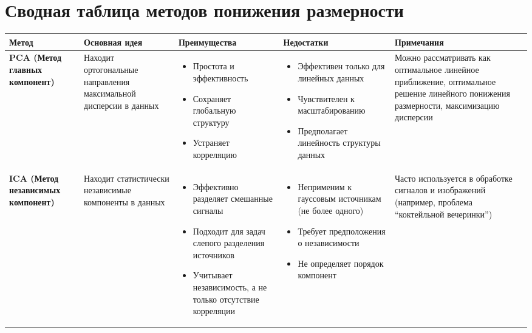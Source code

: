\documentclass[a4paper,12pt]{article}
\begin{document}
\section{Сводная таблица методов понижения размерности}


{\small
\begin{longtable}{|p{3.5cm}|p{3.5cm}|p{2.8cm}|p{2.8cm}|p{2.8cm}|}
\hline
\textbf{Метод} & \textbf{Основная идея} & \textbf{Преимущества} & \textbf{Недостатки} & \textbf{Примечания} \\
\hline
\endhead

\textbf{PCA (Метод главных компонент)} & 
Находит ортогональные направления максимальной дисперсии в данных & 
\begin{itemize}[leftmargin=*]
    \item Простота и эффективность
    \item Сохраняет глобальную структуру
    \item Устраняет корреляцию
\end{itemize} & 
\begin{itemize}[leftmargin=*]
    \item Эффективен только для линейных данных
    \item Чувствителен к масштабированию
    \item Предполагает линейность структуры данных
\end{itemize} & 
Можно рассматривать как оптимальное линейное приближение, оптимальное решение линейного понижения размерности, максимизацию дисперсии \\
\hline

\textbf{ICA (Метод независимых компонент)} & 
Находит статистически независимые компоненты в данных & 
\begin{itemize}[leftmargin=*]
    \item Эффективно разделяет смешанные сигналы
    \item Подходит для задач слепого разделения источников
    \item Учитывает независимость, а не только отсутствие корреляции
\end{itemize} & 
\begin{itemize}[leftmargin=*]
    \item Неприменим к гауссовым источникам (не более одного)
    \item Требует предположения о независимости
    \item Не определяет порядок компонент
\end{itemize} & 
Часто используется в обработке сигналов и изображений (например, проблема ``коктейльной вечеринки'') \\
\hline


\end{longtable}}
\end{document}
